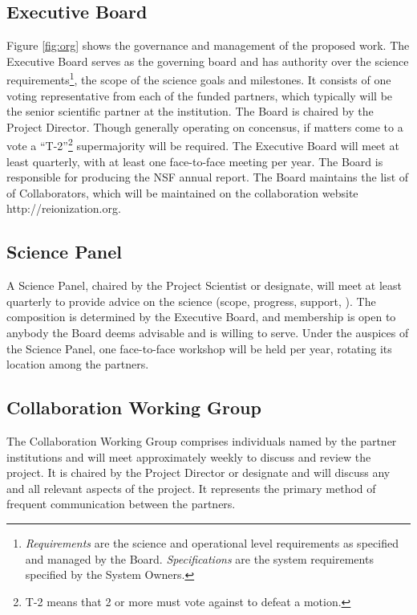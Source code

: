 \documentclass[preprint]{aastex}
\begin{document}
\subsection{Executive Board}
Figure \ref{fig:org} shows the governance and management of the proposed work. The
Executive Board serves as the governing board and has authority over the science
requirements\footnote{{\em Requirements} are the science and operational level
requirements as specified and managed by the Board. {\em Specifications} are the
system requirements specified by the System Owners.}, the scope of the science goals
and milestones. It consists of one voting representative from each of the funded
partners, which typically will be the senior scientific partner at the institution.
The Board is chaired by the Project Director. Though generally operating on
concensus, if matters come to a vote a ``T-2''\footnote{T-2 means that 2 or more must
vote against to defeat a motion.} supermajority will be required. The Executive Board
will meet at least quarterly, with at least one face-to-face meeting per year. The
Board is responsible for producing the NSF annual report. The Board maintains the
list of of Collaborators, which will be maintained on the collaboration website
http://reionization.org.

\subsection{Science Panel}
A Science Panel, chaired by the Project Scientist or designate, will meet at least
quarterly to provide advice on the science (scope, progress, support, ). The
composition is determined by the Executive Board, and membership is open to anybody
the Board deems advisable and is willing to serve. Under the auspices of the Science
Panel, one face-to-face workshop will be held per year, rotating its location among
the partners.

\subsection{Collaboration Working Group}
The Collaboration Working Group comprises individuals named by the partner
institutions and will meet approximately weekly to discuss and review the project. It is chaired
by the Project Director or designate and will discuss any and all relevant aspects of
the project. It represents the primary method of frequent communication between the
partners.
\end{document}
